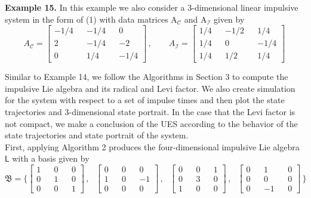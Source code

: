 \documentclass[11pt,a4paper]{article}
\begin{document}
\textbf{Example 15.} In this example we also consider a 3-dimensional linear impulsive system in the form of (1) with data matrices $\mathrm{A}_\mathcal{C}$ and $\mathrm{A}_\mathcal{I}$ given by
$$
A_{\mathcal{C}} = 
	\left[
	\begin{aligned}
	-1/4 && -1/4 &&  0  \\
	   2 && -1/4 && -2  \\
	   0 &&  1/4 && -1/4
	\end{aligned}
	\right]\,,
\qquad		
A_{\mathcal{I}} = 
	\left[
	\begin{aligned}
	 1/4 && -1/2  && 1/4 \\
	 1/4 &&    0  && -1/4  \\
	 1/4 &&  1/2  && 1/4
	\end{aligned}
	\right]\,
$$

Similar to Example 14, we follow the Algorithms in Section 3 to compute the impulsive Lie algebra and its radical and Levi factor. We also create simulation for the system with respect to a set of impulse times and then plot the state trajectories and 3-dimensional state portrait. In the case that the Levi factor is not compact, we make a conclusion of the UES according to the behavior of the state trajectories and state portrait of the system. \\

First, applying Algorithm 2 produces the four-dimensional impulsive Lie algebra $\mathsf{L}$ with a basis given by
$$
\mathfrak{B} = \{ 
	\left[
	\begin{aligned}
	 1 && 0 &&  0  \\
	 0 && 1 &&  0  \\
	 0 && 0 &&  1
	\end{aligned}
	\right]\,,
\text{ }		
	\left[
	\begin{aligned}
	 0 && 0 && 0 \\
	 1 && 0 && -1  \\
	 0 && 0 && 0
	\end{aligned}
	\right]\,,
\text{ }		
	\left[
	\begin{aligned}
	 0 && 0 && 1 \\
	 0 && 3 && 0  \\
	 1 && 0 && 0
	\end{aligned}
	\right]\,,
	\text{ }		
	\left[
	\begin{aligned}
	 0 && 1 && 0 \\
	 0 && 0 && 0  \\
	 0 && -1 && 0
	\end{aligned}
	\right]\,
	\}
$$
\end{document}

